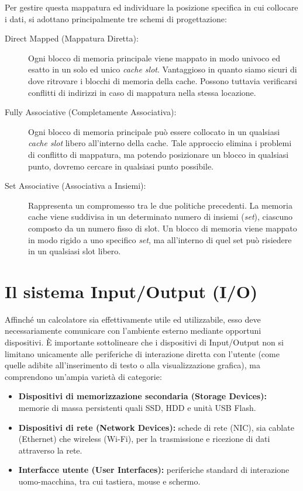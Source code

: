 \documentclass[12pt]{report}
\begin{document}
	Per gestire questa mappatura ed individuare la posizione specifica in cui collocare i dati, si adottano principalmente tre schemi di progettazione:
	
	\begin{description}
		\item [Direct Mapped (Mappatura Diretta):] Ogni blocco di memoria principale viene mappato in modo univoco ed esatto in un solo ed unico \textit{cache slot}. Vantaggioso in quanto siamo sicuri di dove ritrovare i blocchi di memoria della cache. Possono tuttavia verificarsi conflitti di indirizzi in caso di mappatura nella stessa locazione.
		
		\item [Fully Associative (Completamente Associativa):] Ogni blocco di memoria principale può essere collocato in un qualsiasi \textit{cache slot} libero all'interno della cache. Tale approccio elimina i problemi di conflitto di mappatura, ma potendo posizionare un blocco in qualsiasi punto, dovremo cercare in qualsiasi punto possibile.
		
		\item [Set Associative (Associativa a Insiemi):] Rappresenta un compromesso tra le due politiche precedenti. La memoria cache viene suddivisa in un determinato numero di insiemi (\textit{set}), ciascuno composto da un numero fisso di slot. Un blocco di memoria viene mappato in modo rigido a uno specifico \textit{set}, ma all'interno di quel set può risiedere in un qualsiasi slot libero.
	\end{description}
	
	\section{Il sistema Input/Output (I/O)}
	
	Affinché un calcolatore sia effettivamente utile ed utilizzabile, esso deve necessariamente comunicare con l'ambiente esterno mediante opportuni dispositivi. È importante sottolineare che i dispositivi di Input/Output non si limitano unicamente alle periferiche di interazione diretta con l'utente (come quelle adibite all'inserimento di testo o alla visualizzazione grafica), ma comprendono un'ampia varietà di categorie:
	
	\begin{itemize}
		\item \textbf{Dispositivi di memorizzazione secondaria (Storage Devices):} memorie di massa persistenti quali SSD, HDD e unità USB Flash.
		\item \textbf{Dispositivi di rete (Network Devices):} schede di rete (NIC), sia cablate (Ethernet) che wireless (Wi-Fi), per la trasmissione e ricezione di dati attraverso la rete.
		\item \textbf{Interfacce utente (User Interfaces):} periferiche standard di interazione uomo-macchina, tra cui tastiera, mouse e schermo.
	\end{itemize}
	
\end{document}
